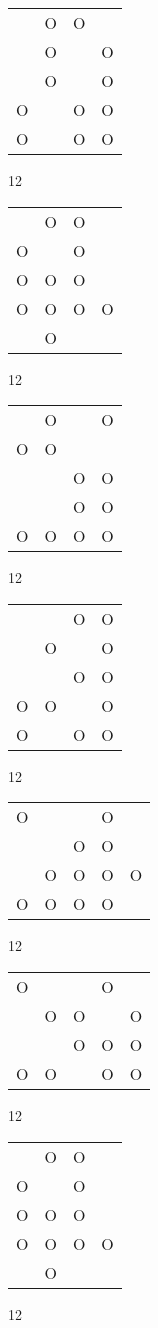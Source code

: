 \begin{tabular}{|m{0.2cm}m{0.2cm}m{0.2cm}m{0.2cm}|}\hline
 &O&O& \\
 &O& &O\\
 &O& &O\\
O& &O&O\\
O& &O&O\\
\hline\end{tabular}12
\begin{tabular}{|m{0.2cm}m{0.2cm}m{0.2cm}m{0.2cm}|}\hline
 &O&O& \\
O& &O& \\
O&O&O& \\
O&O&O&O\\
 &O& & \\
\hline\end{tabular}12
\begin{tabular}{|m{0.2cm}m{0.2cm}m{0.2cm}m{0.2cm}|}\hline
 &O& &O\\
O&O& & \\
 & &O&O\\
 & &O&O\\
O&O&O&O\\
\hline\end{tabular}12
\begin{tabular}{|m{0.2cm}m{0.2cm}m{0.2cm}m{0.2cm}|}\hline
 & &O&O\\
 &O& &O\\
 & &O&O\\
O&O& &O\\
O& &O&O\\
\hline\end{tabular}12
\begin{tabular}{|m{0.2cm}m{0.2cm}m{0.2cm}m{0.2cm}m{0.2cm}|}\hline
O& & &O& \\
 & &O&O& \\
 &O&O&O&O\\
O&O&O&O& \\
\hline\end{tabular}12
\begin{tabular}{|m{0.2cm}m{0.2cm}m{0.2cm}m{0.2cm}m{0.2cm}|}\hline
O& & &O& \\
 &O&O& &O\\
 & &O&O&O\\
O&O& &O&O\\
\hline\end{tabular}12
\begin{tabular}{|m{0.2cm}m{0.2cm}m{0.2cm}m{0.2cm}|}\hline
 &O&O& \\
O& &O& \\
O&O&O& \\
O&O&O&O\\
 &O& & \\
\hline\end{tabular}12
